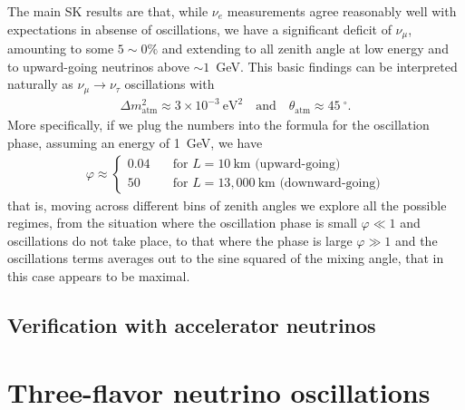 The main SK results are that, while $\nu_e$ measurements agree reasonably well with
expectations in absense of oscillations, we have a significant deficit of
$\nu_\mu$, amounting to some $5\sim 0\%$ and extending to all zenith angle at low
energy and to upward-going neutrinos above $\sim 1$~GeV. This basic findings can be
interpreted naturally as $\nu_\mu \rightarrow \nu_\tau$ oscillations with
\begin{align}
  \Delta m^2_\text{atm} \approx 3 \times 10^{-3}~\text{eV}^2
  \quad\text{and}\quad
  \theta_\text{atm} \approx 45~^\circ.
\end{align}
More specifically, if we plug the numbers into the formula for the oscillation phase,
assuming an energy of 1~GeV, we have
\begin{align*}
  \varphi \approx \begin{cases}
  0.04 & \quad\text{for } L = 10~\text{km (upward-going)}\\
  50   & \quad\text{for } L = 13,000~\text{km (downward-going)}
\end{cases}
\end{align*}
that is, moving across different bins of zenith angles we explore all the possible
regimes, from the situation where the oscillation phase is small $\varphi \ll 1$
and oscillations do not take place, to that where the phase is large $\varphi \gg 1$
and the oscillations terms averages out to the sine squared of the mixing angle,
that in this case appears to be maximal.


\subsection{Verification with accelerator neutrinos}


\section{Three-flavor neutrino oscillations}

